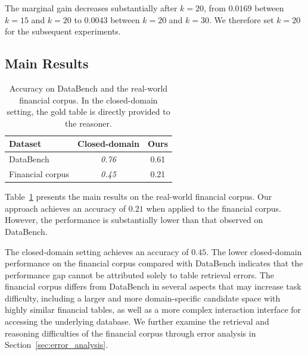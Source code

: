 The marginal gain decreases substantially after $k=20$, from $0.0169$ between $k=15$ and $k=20$ to $0.0043$ between $k=20$ and $k=30$.
We therefore set $k=20$ for the subsequent experiments.
\subsection{Main Results}

\begin{table}[t]
\centering
\small
\begin{tabular}{lcc}
\hline
\textbf{Dataset} & \textbf{Closed-domain} & \textbf{Ours} \\
\hline
DataBench        & \textit{0.76} & 0.61 \\
Financial corpus & \textit{0.45} & 0.21 \\
\hline
\end{tabular}
\caption{Accuracy on DataBench and the real-world financial corpus. In the closed-domain setting, the gold table is directly provided to the reasoner.}
\label{tab:financial_main_results}
\end{table}

Table~\ref{tab:financial_main_results} presents the main results on the real-world financial corpus.
Our approach achieves an accuracy of $0.21$ when applied to the financial corpus.
However, the performance is substantially lower than that observed on DataBench.

The closed-domain setting achieves an accuracy of $0.45$.
The lower closed-domain performance on the financial corpus compared with DataBench indicates that the performance gap cannot be attributed solely to table retrieval errors.
The financial corpus differs from DataBench in several aspects that may increase task difficulty, including a larger and more domain-specific candidate space with highly similar financial tables, as well as a more complex interaction interface for accessing the underlying database.
We further examine the retrieval and reasoning difficulties of the financial corpus through error analysis in Section~\ref{sec:error_analysis}.